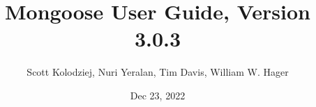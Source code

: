 \title{Mongoose User Guide, Version 3.0.3}
\author{Scott Kolodziej, Nuri Yeralan, Tim Davis, William W. Hager}
\date{Dec 23, 2022}

